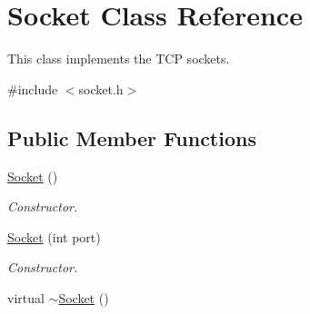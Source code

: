 \hypertarget{classSocket}{\section{Socket Class Reference}
\label{classSocket}
}


This class implements the T\+C\+P sockets.  




{\ttfamily \#include $<$socket.\+h$>$}

\subsection*{Public Member Functions}
\begin{DoxyCompactItemize}
\item 
\hypertarget{classSocket_a7c3256c4fc6e2c603df73201049fae5a}{\hyperlink{classSocket_a7c3256c4fc6e2c603df73201049fae5a}{Socket} ()}\label{classSocket_a7c3256c4fc6e2c603df73201049fae5a}

\begin{DoxyCompactList}\small\item\em Constructor. \end{DoxyCompactList}\item 
\hyperlink{classSocket_a1c4718d5b4b33f92559ba413ad119c03}{Socket} (int port)
\begin{DoxyCompactList}\small\item\em Constructor. \end{DoxyCompactList}\item 
\hypertarget{classSocket_a594ef9479fc328ef703294d5c98fd024}{virtual \hyperlink{classSocket_a594ef9479fc328ef703294d5c98fd024}{$\sim$\+Socket} ()}\label{classSocket_a594ef9479fc328ef703294d5c98fd024}


\end{DoxyCompactItemize}
